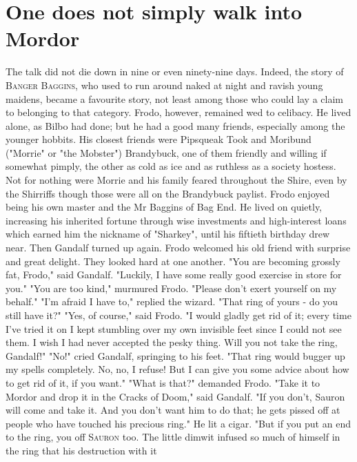 \chapter[Concerning the Ring]{One does not simply walk into Mordor}

The talk did not die down in nine or even ninety-nine days. Indeed, the
story of \textcolor{RawSienna}{\textsc{\LARGE Banger Baggins}}, who used to run around naked at night and ravish
young maidens, became a favourite story, not least among those who could lay
a claim to belonging to that category. Frodo, however, remained wed to
celibacy. He lived alone, as Bilbo had done; but he had a good many friends,
especially among the younger hobbits. His closest friends were Pipsqueak
Took and Moribund ("Morrie" or "the Mobster") Brandybuck, one of them
friendly and willing if somewhat pimply, the other as cold as ice and as
ruthless as a society hostess. Not for nothing were Morrie and his family
feared throughout the Shire, even by the Shirriffs though those were all on
the Brandybuck paylist.
  Frodo enjoyed being his own master and the Mr Baggins of Bag End. He
lived on quietly, increasing his inherited fortune through wise investments
and high-interest loans which earned him the nickname of "Sharkey", until
his fiftieth birthday drew near. Then Gandalf turned up again. Frodo
welcomed his old friend with surprise and great delight. They looked hard at
one another.
  "You are becoming grossly fat, Frodo," said Gandalf. "Luckily, I have some
really good exercise in store for you."
  "You are too kind," murmured Frodo. "Please don't exert yourself on my
behalf."
  "I'm afraid I have to," replied the wizard. "That ring of yours - do you
still have it?"
  "Yes, of course," said Frodo. "I would gladly get rid of it; every time
I've tried it on I kept stumbling over my own invisible feet since I could
not see them. I wish I had never accepted the pesky thing. Will you not take
the ring, Gandalf!"
  "No!" cried Gandalf, springing to his feet. "That ring would bugger up my
spells completely. No, no, I refuse! But I can give you some advice about
how to get rid of it, if you want."
  "What is that?" demanded Frodo.
  "Take it to Mordor and drop it in the Cracks of Doom," said Gandalf. "If
you don't, Sauron will come and take it. And you don't want him to do that;
he gets pissed off at people who have touched his precious ring." He lit a
cigar. "But if you put an end to the ring, you off \textcolor{RedOrange}{\textsc{\LARGE Sauron}} too. The little
dimwit infused so much of himself in the ring that his destruction with it
